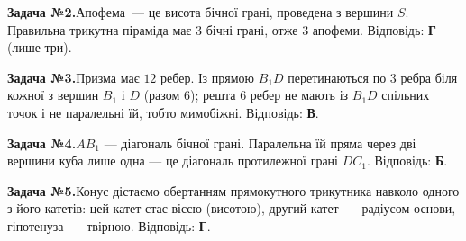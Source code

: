 \documentclass[12pt]{article}
\begin{document}
\par\vspace{0.3cm}\noindent\hypertarget{sol:2}{}
\begin{tcolorbox}[colback=titleBg!40, colframe=mainGreen!55, boxrule=0.4pt, arc=2pt, left=6pt, right=6pt, top=4pt, bottom=4pt, breakable]
\noindent\small\textbf{Задача №2.}\quad Апофема~--- це висота бічної грані, проведена з вершини $S$. Правильна трикутна піраміда має $3$ бічні грані, отже $3$ апофеми. Відповідь: \textbf{Г} (лише три).
\par\vspace{0.1cm}\hfill\hyperlink{task:2}{}
\end{tcolorbox}
\par\vspace{0.3cm}\noindent\hypertarget{sol:3}{}
\begin{tcolorbox}[colback=titleBg!40, colframe=mainGreen!55, boxrule=0.4pt, arc=2pt, left=6pt, right=6pt, top=4pt, bottom=4pt, breakable]
\noindent\small\textbf{Задача №3.}\quad Призма має $12$ ребер. Із прямою $B_1D$ перетинаються по $3$ ребра біля кожної з вершин $B_1$ і $D$ (разом $6$); решта $6$ ребер не мають із $B_1D$ спільних точок і не паралельні їй, тобто мимобіжні. Відповідь: \textbf{В}.
\par\vspace{0.1cm}\hfill\hyperlink{task:3}{}
\end{tcolorbox}
\par\vspace{0.3cm}\noindent\hypertarget{sol:4}{}
\begin{tcolorbox}[colback=titleBg!40, colframe=mainGreen!55, boxrule=0.4pt, arc=2pt, left=6pt, right=6pt, top=4pt, bottom=4pt, breakable]
\noindent\small\textbf{Задача №4.}\quad $AB_1$ --- діагональ бічної грані. Паралельна їй пряма через дві вершини куба лише одна --- це діагональ протилежної грані $DC_1$. Відповідь: \textbf{Б}.
\par\vspace{0.1cm}\hfill\hyperlink{task:4}{}
\end{tcolorbox}
\par\vspace{0.3cm}\noindent\hypertarget{sol:5}{}
\begin{tcolorbox}[colback=titleBg!40, colframe=mainGreen!55, boxrule=0.4pt, arc=2pt, left=6pt, right=6pt, top=4pt, bottom=4pt, breakable]
\noindent\small\textbf{Задача №5.}\quad Конус дістаємо обертанням прямокутного трикутника навколо одного з його катетів: цей катет стає віссю (висотою), другий катет~--- радіусом основи, гіпотенуза~--- твірною. Відповідь: \textbf{Г}.
\par\vspace{0.1cm}\hfill\hyperlink{task:5}{}
\end{tcolorbox}
\end{document}
